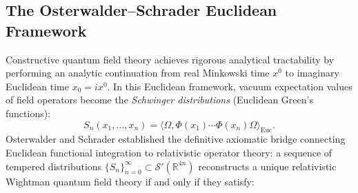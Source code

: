 \subsection{The Osterwalder--Schrader Euclidean Framework}
\label{subsec:os_axioms}
Constructive quantum field theory achieves rigorous analytical tractability by performing an analytic continuation from real Minkowski time $x^0$ to imaginary Euclidean time $x_0 = i x^0$. In this Euclidean framework, vacuum expectation values of field operators become the \emph{Schwinger distributions} (Euclidean Green's functions):
\begin{equation}
S_n(x_1, \dots, x_n) = \langle \Omega, \Phi(x_1) \cdots \Phi(x_n) \Omega \rangle_{\mathrm{Euc}}.
\end{equation}
Osterwalder and Schrader \cite{OsterwalderSchrader1973, OsterwalderSchrader1975} established the definitive axiomatic bridge connecting Euclidean functional integration to relativistic operator theory: a sequence of tempered distributions $\{S_n\}_{n=0}^\infty \subset \mathcal{S}'(\mathbb{R}^{4n})$ reconstructs a unique relativistic Wightman quantum field theory if and only if they satisfy:
